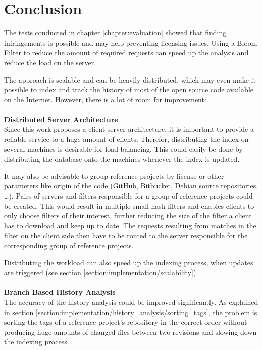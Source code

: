 
\chapter{Conclusion}\label{chapter:conclusion}
The tests conducted in chapter \ref{chapter:evaluation} showed that finding infringements is possible and may help preventing licensing issues.
Using a Bloom Filter to reduce the amount of required requests can speed up the analysis and reduce the load on the server.

The approach is scalable and can be heavily distributed, which may even make it possible to index and track the history of most of the open source code available on the Internet.
However, there is a lot of room for improvement:\\
\\
\textbf{Distributed Server Architecture}\\
Since this work proposes a client-server architecture, it is important to provide a reliable service to a huge amount of clients.
Therefor, distributing the index on several machines is desirable for load balancing.
This could easily be done by distributing the database onto the machines whenever the index is updated.

It may also be advisable to group reference projects by license or other parameters like origin of the code (GitHub, Bitbucket, Debian source repositories, \dots).
Pairs of servers and filters responsible for a group of reference projects could be created.
This would result in multiple small hash filters and enables clients to only choose filters of their interest, further reducing the size of the filter a client has to download and keep up to date.
The requests resulting from matches in the filter on the client side then have to be routed to the server responsible for the corresponding group of reference projects.

Distributing the workload can also speed up the indexing process, when updates are triggered (see section \ref{section:implementation/scalability}).\\
\\
\textbf{Branch Based History Analysis}\\
The accuracy of the history analysis could be improved significantly.
As explained in section \ref{section:implementation/history_analysis/sorting_tags}, the problem is sorting the tags of a reference project's repository in the correct order without producing huge amounts of changed files between two revisions and slowing down the indexing process.

